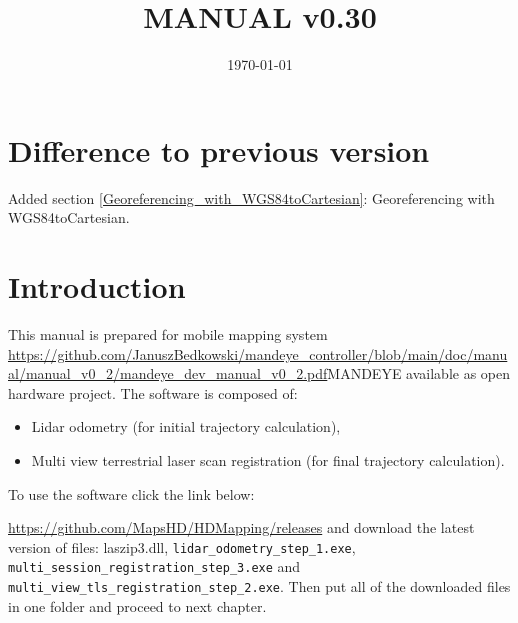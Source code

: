 \documentclass[a4paper,12pt]{book}
\begin{document}
\author{}
\title{MANUAL v0.30}
\date{\today}

\frontmatter
\maketitle
\tableofcontents

\mainmatter

\chapter{Difference to previous version}
Added section \ref{Georeferencing_with_WGS84toCartesian}: Georeferencing with WGS84toCartesian.

\chapter{Introduction}
This manual is prepared for mobile mapping system \url{https://github.com/JanuszBedkowski/mandeye_controller/blob/main/doc/manual/manual_v0_2/mandeye_dev_manual_v0_2.pdf}{MANDEYE} available as open hardware project.
The software is composed of:
\begin{itemize}
	\item Lidar odometry (for initial trajectory calculation),
	\item Multi view terrestrial laser scan registration (for final trajectory calculation).
\end{itemize}
To use the software click the link below:

\url{https://github.com/MapsHD/HDMapping/releases}
\linebreak
and download the latest version of files: laszip3.dll, \verb|lidar_odometry_step_1.exe|, \verb|multi_session_registration_step_3.exe|  and \verb|multi_view_tls_registration_step_2.exe|.
Then put all of the downloaded files in one folder and proceed to next chapter.













\backmatter
\end{document}
